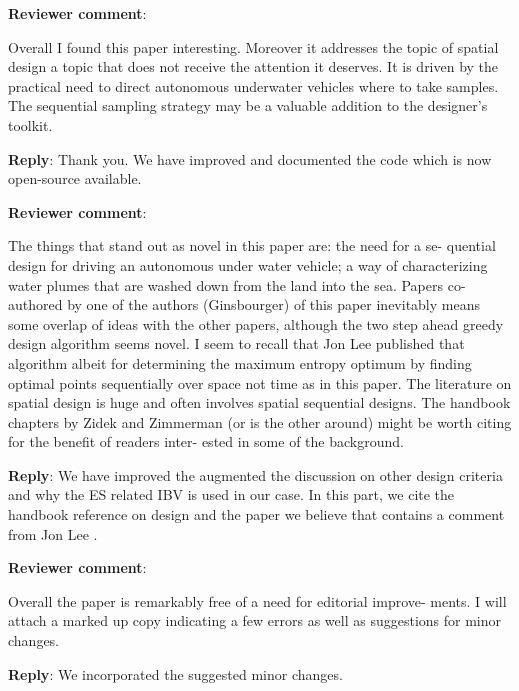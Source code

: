 \documentclass[a4paper]{article}
\newcounter{reviewer}
\def\revcom{\textbf{Reviewer comment}}
\def\reply{\textbf{Reply}}
\begin{document}
\setcounter{reviewer}{1}

\begin{answers}


\item{\revcom  :}\label{r1c3}

Overall I found this paper interesting. Moreover it addresses the topic of spatial design a topic that does not receive the attention it deserves. It is driven by the practical need to direct autonomous underwater vehicles where to take samples. The sequential sampling strategy may be a valuable addition to the designer’s toolkit.

\reply: Thank you. We have improved and documented the code which is now open-source available. 

\item{\revcom  :}\label{r1c3}

The things that stand out as novel in this paper are: the need for a se- quential design for driving an autonomous under water vehicle; a way of characterizing water plumes that are washed down from the land into the sea. Papers co-authored by one of the authors (Ginsbourger) of this paper inevitably means some overlap of ideas with the other papers, although the two step ahead greedy design algorithm seems novel. I seem to recall that Jon Lee published that algorithm albeit for determining the maximum entropy optimum by finding optimal points sequentially over space not time as in this paper. The literature on spatial design is huge and often involves spatial sequential designs. The handbook chapters by Zidek and Zimmerman (or is the other around) might be worth citing for the benefit of readers inter- ested in some of the background.

\reply: We have improved the augmented the discussion on other design criteria and why the ES related IBV is used in our case. In this part, we cite the handbook reference on design \cite{zidek2019monitoring} and the paper we believe that contains a comment from Jon Lee \citep{bueso1998state}.  

\item{\revcom  :}\label{r1c3}

Overall the paper is remarkably free of a need for editorial improve- ments. I will attach a marked up copy indicating a few errors as well as suggestions for minor changes.

\reply: We incorporated the suggested minor changes.


\end{answers}
\end{document}

